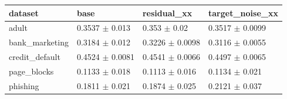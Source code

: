 \begin{tabular}{llll}
\toprule
dataset & base & residual\_xx & target\_noise\_xx \\
\midrule
adult & 0.3537 $\pm$ 0.013 & 0.353 $\pm$ 0.02 & 0.3517 $\pm$ 0.0099 \\
bank\_marketing & 0.3184 $\pm$ 0.012 & 0.3226 $\pm$ 0.0098 & 0.3116 $\pm$ 0.0055 \\
credit\_default & 0.4524 $\pm$ 0.0081 & 0.4541 $\pm$ 0.0066 & 0.4497 $\pm$ 0.0065 \\
page\_blocks & 0.1133 $\pm$ 0.018 & 0.1113 $\pm$ 0.016 & 0.1134 $\pm$ 0.021 \\
phishing & 0.1811 $\pm$ 0.021 & 0.1874 $\pm$ 0.025 & 0.2121 $\pm$ 0.037 \\
\bottomrule
\end{tabular}
